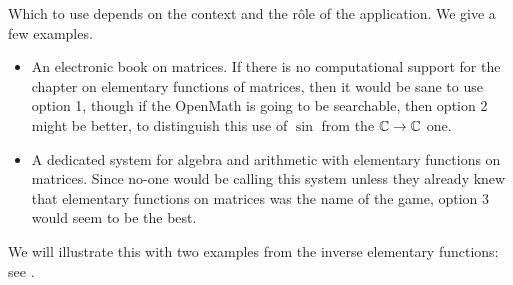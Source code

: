 \documentclass[keylogo]{openmath}
\begin{document}
Which to use depends on the context and the r\^ole of the application. We
give a few examples.
\begin{itemize}
\item An electronic book on matrices. If there is no computational support
for the chapter on elementary functions of matrices, then it would be sane
to use option 1, though if the OpenMath is going to be searchable, then
option 2 might be better, to distinguish this use of $\sin$ from the
$\mathbb{C}\rightarrow\mathbb{C}$ one.
\item A dedicated system for algebra and arithmetic with elementary
functions on matrices. Since no-one would be calling this system unless
they already knew that elementary functions on matrices was the name of the
game, option 3 would seem to be the best.
\end{itemize}
\label{arccot}
We will illustrate this with two examples from the inverse elementary
functions: see \cite{CDJW}.
\end{document}
